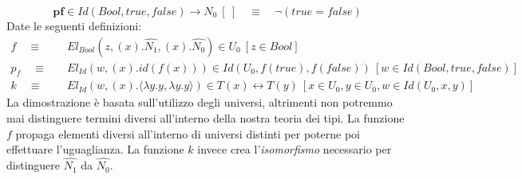 \begin{displaymath}
    \textbf{pf} \in Id(Bool, true, false) \rightarrow N_0\ [\ ]\quad \equiv\quad \neg (true = false)
\end{displaymath}
Date le seguenti definizioni:
\begin{align*}
    f\quad \equiv&\quad El_{Bool}(z, (x).\hat{N_1}, (x).\hat{N_0}) \in U_0\ [z \in Bool]\\
    p_f\quad \equiv&\quad El_{Id}(w, (x).id(f(x))) \in Id(U_0, f(true), f(false))\ [w \in Id(Bool, true, false)]\\
    k\quad \equiv&\quad El_{Id}(w, (x).\langle \lambda y.y, \lambda y.y \rangle) \in T(x) \leftrightarrow T(y)\ [x \in U_0, y \in U_0, w \in Id(U_0, x, y)]
\end{align*}
La dimostrazione è basata sull'utilizzo degli universi, altrimenti non potremmo mai distinguere termini diversi all'interno della nostra teoria dei tipi.
La funzione $f$ propaga elementi diversi all'interno di universi distinti per poterne poi effettuare l'uguaglianza.
La funzione $k$ invece crea l'\textit{isomorfismo} necessario per distinguere $\hat{N_1}$ da $\hat{N_0}$.
